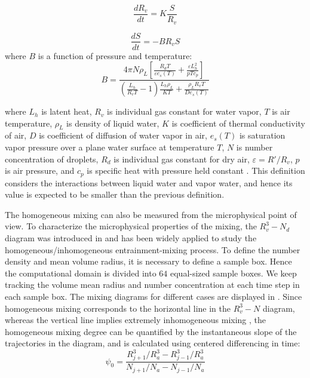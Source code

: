 \begin{equation}
\frac{dR_{v}}{dt}=K\frac{S}{R_{v}}\label{eq:DiffR}
\end{equation}

\begin{equation}
\frac{dS}{dt}=-BR_{v}S\label{eq:DiffSuper}
\end{equation}
where $B$ is a function of pressure and temperature:
\begin{equation}
B = 
\frac{4\pi N\rho_L[\frac{R_dT}{\varepsilon e_s(T)} + \frac{\varepsilon L^2_h}{pTc_p}]} 
{(\frac{L_h}{R_vT}-1)\frac{L_h\rho_L}{KT} + \frac{\rho_L R_v T}{De_s(T)}}
\end{equation}

where $L_h$ is latent heat, $R_v$ is individual gas constant for water vapor,
$T$ is air temperature, $\rho_L$ is density of liquid water, $K$ is coefficient
of thermal conductivity of air, $D$ is coefficient of diffusion of water vapor
in air, $e_s(T)$ is saturation vapor pressure over a plane water surface at
temperature $T$, $N$ is number concentration of droplets, $R_d$ is individual
gas constant for dry air, $\varepsilon = R'/R_v$, $p$ is air pressure, and
$c_p$ is specific heat with pressure held constant \cite{Lu2011}.
This definition considers the interactions between liquid water and vapor water, 
and hence its value is expected to be smaller than the previous definition. 

The homogeneous mixing can also be measured from the microphysical point of view. 
To characterize the microphysical properties of the mixing, the $R_v^3-N_d$ 
diagram was introduced in \cite{Burnet2007Observational} and has been widely applied to study the
homogeneous/inhomogeneous entrainment-mixing process. To define the number 
density and mean volume radius, it is necessary to define a sample box. Hence 
the computational domain is divided into $64$ equal-sized sample boxes. We keep 
tracking the volume mean radius and number concentration at each time step in 
each sample box. The mixing diagrams for different cases are displayed in 
. Since homogeneous mixing corresponds to the horizontal 
line in the $R_v^3-N$ diagram, whereas the vertical line implies extremely inhomogeneous 
mixing \cite{Andrejczuk2009}, the homogeneous mixing degree can be quantified by the instantaneous slope 
of the trajectories in the diagram, and is calculated using centered differencing 
in time:
\begin{equation}
\psi_0 = \frac{R_{j+1}^3/R_a^3 - R_{j-1}^3/R_a^3}{N_{j+1}/N_a - N_{j-1}/N_a}
\label{phi0}
\end{equation}

